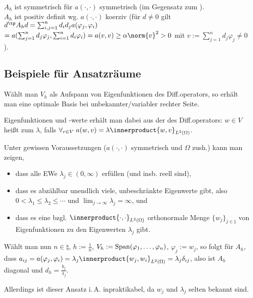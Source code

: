 \begin{Bem}
    $A_h$ ist symmetrisch für $a(\cdot, \cdot)$ symmetrisch
    (im Gegensatz zum ).\\
    $A_h$ ist positiv definit wg. $a(\cdot, \cdot)$ koerziv
    (für $d \not= 0$ gilt
    $d^\tp A_h d = \sum_{i,j=1}^n d_i d_j a(\varphi_j, \varphi_i)$\\
    $= a(\sum_{j=1}^n d_j \varphi_j, \sum_{i=1}^n d_i \varphi_i)
    = a(v, v) \ge \alpha \norm{v}^2 > 0$
    mit $v := \sum_{j=1}^n d_j \varphi_j \not= 0$).
\end{Bem}

\subsection{%
    Beispiele für Ansatzräume%
}

\begin{Bsp}
    Wählt man $V_h$ als Aufspann von Eigenfunktionen des Diff.operators,
    so erhält man eine optimale Basis bei unbekannter/variabler rechter Seite.

    Eigenfunktionen und -werte erhält man dabei aus der
     des Diff.operators:
    $w \in V$ heißt  zum  $\lambda$, falls
    $\forall_{v \in V}\; a(w, v) = \lambda \innerproduct{w, v}_{L^2(\Omega)}$.

    Unter gewissen Voraussetzungen ($a(\cdot, \cdot)$ symmetrisch und $\Omega$ zush.)
    kann man zeigen,
    \begin{itemize}
        \item
        dass alle EWe $\lambda_j \in (0, \infty)$ erfüllen (und insb. reell sind),

        \item
        dass es abzählbar unendlich viele, unbeschränkte Eigenwerte gibt,
        also $0 < \lambda_1 \le \lambda_2 \le \dotsb$ und
        $\lim_{j \to \infty} \lambda_j = \infty$, und

        \item
        dass es eine bzgl. $\innerproduct{\cdot, \cdot}_{L^2(\Omega)}$ orthonormale Menge
        $\{w_j\}_{j\in\natural}$ von Eigenfunktionen zu den Eigenwerten $\lambda_j$ gibt.
    \end{itemize}

    Wählt man nun $n \in \natural$, $h := \frac{1}{n}$,
    $V_h := \operatorname{Span}(\varphi_1, \dotsc, \varphi_n)$,
    $\varphi_j := w_j$, so folgt für $A_h$, dass
    $a_{ij} = a(\varphi_j, \varphi_i) = \lambda_j \innerproduct{w_j, w_i}_{L^2(\Omega)}
    = \lambda_j \delta_{ij}$, also ist $A_h$ diagonal und $d_h = \frac{b_j}{\lambda_j}$.

    Allerdings ist dieser Ansatz i.\,A. inpraktikabel, da $w_j$ und $\lambda_j$
    selten bekannt sind.
\end{Bsp}

